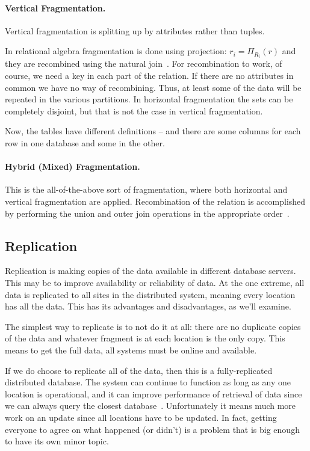 \documentclass[a4paper]{report}
\begin{document}
\paragraph{Vertical Fragmentation.} Vertical fragmentation is splitting up by attributes rather than tuples. 

In relational algebra fragmentation is done using projection: $r_{i} = \Pi_{R_{i}}
(r)$ and they are recombined using the natural join~\cite{dsc}.  For recombination to work, of course, we need a key in each part of the relation. If there are no attributes in common we have no way of recombining. Thus, at least some of the data will be repeated in the various partitions. In horizontal fragmentation the sets can be completely disjoint, but that is not the case in vertical fragmentation. 

Now, the tables have different definitions -- and there are some columns for each row in one database and some in the other. 


\paragraph{Hybrid (Mixed) Fragmentation.} This is the all-of-the-above sort of fragmentation, where both horizontal and vertical fragmentation are applied. Recombination of the relation is accomplished by performing the union and outer join operations in the appropriate order~\cite{fds}. 

\subsection*{Replication}

Replication is making copies of the data available in different database servers. This may be to improve availability or reliability of data. At the one extreme, all data is replicated to all sites in the distributed system, meaning every location has all the data. This has its advantages and disadvantages, as we'll examine. 

The simplest way to replicate is to not do it at all: there are no duplicate copies of the data and whatever fragment is at each location is the only copy. This means to get the full data, all systems must be online and available. 

If we do choose to replicate all of the data, then this is a fully-replicated distributed database. The system can continue to function as long as any one location is operational, and it can improve performance of retrieval of data since we can always query the closest database~\cite{fds}. Unfortunately it means much more work on an update since all locations have to be updated. In fact, getting everyone to agree on what happened (or didn't) is a problem that is big enough to have its own minor topic. 
\end{document}
